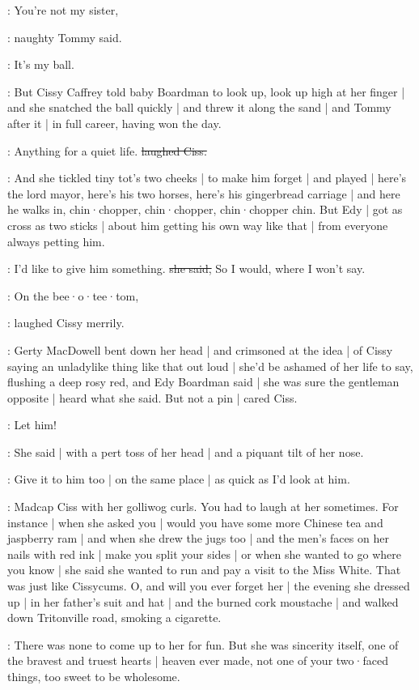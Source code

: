 \tommy:
You're not my sister,

:
naughty Tommy said.

\tommy:
It's my ball.

:
But Cissy Caffrey told baby Boardman to look up,
look up high at her finger |
and she snatched the ball quickly |
and threw it along the sand |
and Tommy after it |
in full career,
having won the day.

\cissy:
Anything for a quiet life.
\sout{laughed Ciss.}

:
And she tickled tiny tot's two cheeks |
to make him forget |
and played |
here's the lord mayor,
here's his two horses,
here's his gingerbread carriage |
and here he walks in,
chin·chopper,
chin·chopper,
chin·chopper chin.
But Edy |
got as cross as two sticks |%
about him getting his own way like that |
from everyone always petting him.

\edy:
I'd like to give him something.
\sout{she said,}
So I would,
where I won't say.

\cissy:
On the bee·o·tee·tom,

:
laughed Cissy merrily.

\Nnovel:
Gerty MacDowell bent down her head |
and crimsoned at the idea |
of Cissy saying an unladylike thing like that out loud |
she'd be ashamed of her life to say,
flushing a deep rosy red,
and Edy Boardman said |
she was sure the gentleman opposite |
heard what she said.
But not a pin |
cared Ciss.

\cissy:
Let him!

:
She said |
with a pert toss of her head |
and a piquant tilt of her nose.

\cissy:
Give it to him too |
on the same place |
as quick as I'd look at him.

\gertyReal:
Madcap Ciss with her golliwog curls.%
You had to laugh at her sometimes.
For instance |
when she asked you |
would you have some more Chinese tea and jaspberry ram |
and when she drew the jugs too |
and the men's faces on her nails with red ink |
make you split your sides |
or when she wanted to go where you know |
she said she wanted to run and pay a visit to the Miss White.
That was just like Cissycums.
O,
and will you ever forget her |
the evening she dressed up |
in her father's suit and hat |
and the burned cork moustache |
and walked down Tritonville road,
smoking a cigarette.

\gertyNovel:
There was none to come up to her for fun.
But she was sincerity itself,
one of the bravest and truest hearts |
heaven ever made,
not one of your two·faced things,%
too sweet to be wholesome.

